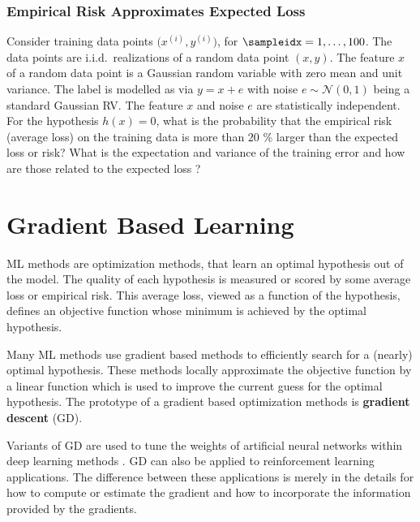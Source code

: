 \documentclass[12pt]{report}
\begin{document}
\subsection{Empirical Risk Approximates Expected Loss} 
\label{ex_chap_5_empriskapp} 
Consider training data points $\big(x^{(i)},y^{(i)} \big)$, for $\sampleidx = 1,\ldots,100$. 
The data points are i.i.d.\ realizations of a random data point $(x,y)$. 
The feature $x$ of a random data point is a Gaussian random variable 
with zero mean and unit variance. The label is modelled as 
via $y = x + e$ with noise $e \sim \mathcal{N}(0,1)$ being 
a standard Gaussian RV. The feature $x$ and noise $e$ 
are statistically independent. For the hypothesis $h(x)=0$, 
what is the probability that the empirical risk (average loss) on 
the training data is more than $20$ \% larger than the 
expected loss or risk? What is the expectation and variance 
of the training error and how are those related to the 
expected loss ? 





\newpage
\chapter{Gradient Based Learning}
\label{ch_GD}

ML methods are optimization methods, that learn an optimal 
hypothesis out of the model. The quality of each hypothesis is 
measured or scored by some average loss or empirical risk. This
average loss, viewed as a function of the hypothesis, defines 
an objective function whose minimum is achieved by the 
optimal hypothesis. 

Many ML methods use gradient based methods to efficiently search 
for a (nearly) optimal hypothesis. These methods locally 
approximate the objective function by a linear function which 
is used to improve the current guess for the optimal hypothesis. 
The prototype of a gradient based optimization methods is 
{\bf gradient descent} (GD). 

Variants of GD are used to tune the weights of artificial neural 
networks within deep learning methods \cite{Goodfellow-et-al-2016}. 
GD can also be applied to reinforcement learning applications. The 
difference between these applications is merely in the details for 
how to compute or estimate the gradient and how to incorporate 
the information provided by the gradients. 
\end{document}
